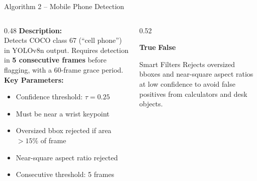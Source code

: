 \documentclass{beamer}
\begin{document}
\begin{frame}{Algorithm 2 -- Mobile Phone Detection}
\begin{columns}
\begin{column}{0.48\textwidth}
\footnotesize
\textbf{Description:}\\
Detects COCO class 67 (``cell phone'') in YOLOv8n output. Requires detection in \textbf{5 consecutive frames} before flagging, with a 60-frame grace period.\\[0.3cm]
\textbf{Key Parameters:}
\begin{itemize}\footnotesize
    \item Confidence threshold: $\tau = 0.25$
    \item Must be near a wrist keypoint
    \item Oversized bbox rejected if area $> 15\%$ of frame
    \item Near-square aspect ratio rejected
    \item Consecutive threshold: 5 frames
\end{itemize}
\end{column}
\begin{column}{0.52\textwidth}
\begin{algorithmic}[1]
\footnotesize
{}
          \State \Return \textbf{True}
        \EndIf
      \EndIf
    \EndIf
  \EndFor
  \State \Return \textbf{False}
\EndFunction
\end{algorithmic}
\vspace{0.4cm}
\begin{block}{\footnotesize Smart Filters}
\footnotesize Rejects oversized bboxes and near-square aspect ratios at low confidence to avoid false positives from calculators and desk objects.
\end{block}
\end{column}
\end{columns}
\end{frame}
\end{document}
